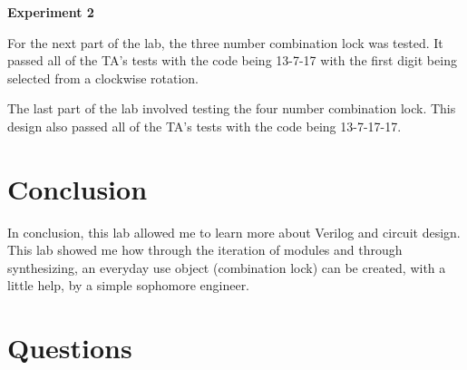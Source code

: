 \documentclass[a4paper,12pt]{article}
\begin{document}
\hspace{-15pt}\textbf{Experiment 2}

For the next part of the lab, the three number combination lock was tested. It passed all of the TA's tests with the code being 13-7-17 with the first digit being selected from a clockwise rotation. 

The last part of the lab involved testing the four number combination lock. This design also passed all of the TA's tests with the code being 13-7-17-17.


\section*{Conclusion}

  \hspace{15pt}In conclusion, this lab allowed me to learn more about Verilog and circuit design. This lab showed me how through the iteration of modules and through synthesizing, an everyday use object (combination lock) can be created, with a little help, by a simple sophomore engineer.


\section*{Questions}
\end{document}
